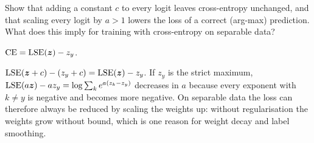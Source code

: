 \begin{problem}\threechili
	Show that adding a constant $c$ to every logit leaves cross-entropy unchanged, and that scaling every logit by $a>1$ lowers the loss of a
	correct (arg-max) prediction. What does this imply for training with cross-entropy on separable data?
	\begin{hint}$\operatorname{CE}=\operatorname{LSE}({\bm{z}})-z_y$.\end{hint}
	\begin{sol}$\operatorname{LSE}({\bm{z}}+c)-(z_y+c)=\operatorname{LSE}({\bm{z}})-z_y$. If $z_y$ is the strict maximum, $\operatorname{LSE}(a{\bm{z}})-az_y=\log\sum_ke^{a(z_k-z_y)}$ decreases in $a$
	because every exponent with $k\ne y$ is negative and becomes more negative. On separable data the loss can therefore always be reduced by
	scaling the weights up: without regularisation the weights grow without bound, which is one reason for weight decay and label smoothing.\end{sol}
\end{problem}
